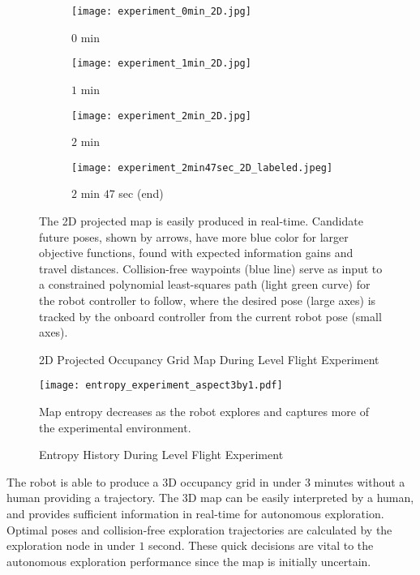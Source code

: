 \begin{figure}[!t]
\centering
    	\begin{subfigure}[t]{0.44\columnwidth}
           	\centering
          	\texttt{[image: experiment\_0min\_2D.jpg]}
        		\caption{$0$ min}
    	\end{subfigure}
    	\begin{subfigure}[t]{0.44\columnwidth}
           	\centering
          	\texttt{[image: experiment\_1min\_2D.jpg]}
        		\caption{$1$ min}
    	\end{subfigure}
    	\begin{subfigure}[t]{0.44\columnwidth}
           	\centering
          	\texttt{[image: experiment\_2min\_2D.jpg]}
        		\caption{$2$ min}
    	\end{subfigure}
    	\begin{subfigure}[t]{0.44\columnwidth}
           	\centering
          	\texttt{[image: experiment\_2min47sec\_2D\_labeled.jpeg]}
        		\caption{$2$ min $47$ sec (end)}
    	\end{subfigure}
	\caption{2D Projected Occupancy Grid Map During Level Flight Experiment}
	\medskip
	\small
	The 2D projected map is easily produced in real-time. Candidate future poses, shown by arrows, have more blue color for larger objective functions, found with expected information gains and travel distances. Collision-free waypoints (blue line) serve as input to a constrained polynomial least-squares path (light green curve) for the robot controller to follow, where the desired pose (large axes) is tracked by the onboard controller from the current robot pose (small axes).
	\label{fig:exp2DMap}
\end{figure}

\begin{figure}[!t]
	\centering
	\texttt{[image: entropy\_experiment\_aspect3by1.pdf]}
	\caption{Entropy History During Level Flight Experiment}
	\medskip
	\small
	Map entropy decreases as the robot explores and captures more of the experimental environment.
	\label{fig:expH}
\end{figure}

The robot is able to produce a 3D occupancy grid in under $3$ minutes without a human providing a trajectory. The 3D map can be easily interpreted by a human, and provides sufficient information in real-time for autonomous exploration. Optimal poses and collision-free exploration trajectories are calculated by the exploration node in under $1$ second. These quick decisions are vital to the autonomous exploration performance since the map is initially uncertain.

